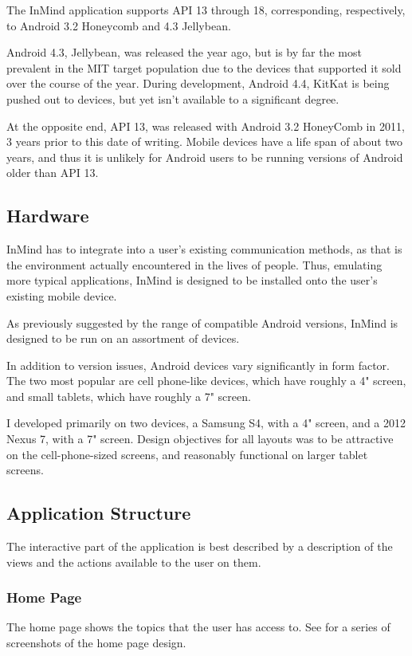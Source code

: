     The InMind application supports API 13 through 18, 
    corresponding, respectively, to Android 3.2 Honeycomb and 4.3 Jellybean.

    Android 4.3, Jellybean, was released the year ago, but is by far
    the most prevalent in the MIT target population due to the devices
    that supported it sold over the course of the year.
    During development, Android 4.4, KitKat is being pushed out to devices,
    but yet isn't available to a significant degree.

    At the opposite end, API 13, was released with Android 3.2 HoneyComb
    in 2011, 3 years prior to this date of writing.
    Mobile devices have a life span of about two years,
    and thus it is unlikely for Android users to be
    running versions of Android older than API 13.

    \subsection{Hardware}
    InMind has to integrate into a user's existing communication methods,
    as that is the environment actually encountered in the lives of people.
    Thus, emulating more typical applications,
    InMind is designed to be installed onto the user's existing mobile device.

    As previously suggested by the range of compatible Android versions,
    InMind is designed to be run on an assortment of devices.
    
    In addition to version issues, Android devices vary significantly in form factor.
    The two most popular are cell phone-like devices, which have roughly a 4" screen,
    and small tablets, which have roughly a 7" screen.

    I developed primarily on two devices, a Samsung S4, with a 4" screen,
    and a 2012 Nexus 7, with a 7" screen.
    Design objectives for all layouts was to be attractive on the cell-phone-sized screens,
    and reasonably functional on larger tablet screens.

    \subsection{Application Structure}
    The interactive part of the application is best described by a description of the views
    and the actions available to the user on them.
      \subsubsection{Home Page}
      The home page shows the topics that the user has access to.
      See \cite{} for a series of screenshots of the home page design.

